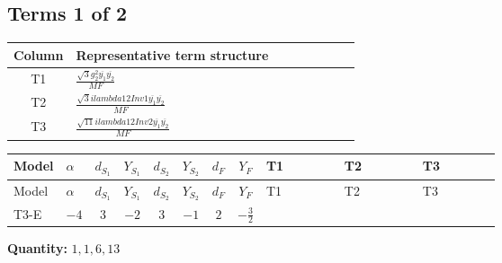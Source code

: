 \documentclass[8pt]{article}
\begin{document}
\begin{landscape}
\subsection*{Terms 1 of 2}
\begin{center}
\begin{tabular}{@{}c >{\raggedright\arraybackslash}p{0.82\linewidth}@{}}
\toprule
Column & Representative term structure \\
\midrule
T1 & \(\displaystyle \frac{\sqrt{3} g_{2}^{2} \overline{y_{1}} \overline{y_{2}}}{MF}\) \\
\midrule
T2 & \(\displaystyle \frac{\sqrt{3} i lambda12Inv1 \overline{y_{1}} \overline{y_{2}}}{MF}\) \\
\midrule
T3 & \(\displaystyle \frac{\sqrt{11} i lambda12Inv2 \overline{y_{1}} \overline{y_{2}}}{MF}\) \\
\midrule
\bottomrule
\end{tabular}
\end{center}
\smallskip
\tiny
\begin{longtable}{@{}llcccccc >{\raggedright\arraybackslash}p{0.21\linewidth} >{\raggedright\arraybackslash}p{0.21\linewidth} >{\raggedright\arraybackslash}p{0.21\linewidth}@{}}
\toprule
Model & $\alpha$ & $d_{S_1}$ & $Y_{S_1}$ & $d_{S_2}$ & $Y_{S_2}$ & $d_F$ & $Y_F$ & T1 & T2 & T3 \\
\midrule
\endfirsthead
\toprule
Model & $\alpha$ & $d_{S_1}$ & $Y_{S_1}$ & $d_{S_2}$ & $Y_{S_2}$ & $d_F$ & $Y_F$ & T1 & T2 & T3 \\
\midrule
\endhead
T3-E & $-4$ & $3$ & $-2$ & $3$ & $-1$ & $2$ & $-\frac{3}{2}$ & \scriptsize\adjustbox{max width=\linewidth}{$\begin{gathered} - \frac{\sqrt{3} g_{2}^{2} \overline{y_{1}} \overline{y_{2}}}{6 MF}\end{gathered}$} & \scriptsize\adjustbox{max width=\linewidth}{$\begin{gathered} - \frac{\sqrt{3} i lambda12Inv1 \overline{y_{1}} \overline{y_{2}}}{6 MF}\end{gathered}$} & \scriptsize\adjustbox{max width=\linewidth}{$\begin{gathered} \frac{3 \sqrt{11} i lambda12Inv2 \overline{y_{1}} \overline{y_{2}}}{22 MF}\end{gathered}$} \\
\midrule
\bottomrule
\end{longtable}
\clearpage
\noindent\textbf{Quantity: }$\mathrm{1,1,6,13}$\par\smallskip

\end{landscape}
\end{document}
